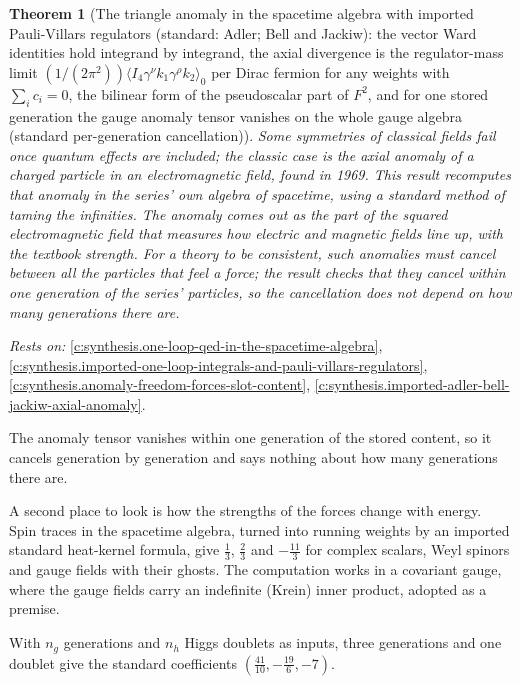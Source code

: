 \documentclass[11pt]{article}
\newtheorem{theorem}{Theorem}[section]
\theoremstyle{definition}
\theoremstyle{plain}
\begin{document}
\begin{theorem}[The triangle anomaly in the spacetime algebra with imported Pauli-Villars regulators (standard: Adler; Bell and Jackiw): the vector Ward identities hold integrand by integrand, the axial divergence is the regulator-mass limit $(1/(2\pi^{2}))\langle I_{4}\gamma^{\nu}k_{1}\gamma^{\rho}k_{2}\rangle_{0}$ per Dirac fermion for any weights with $\sum_{i} c_{i} = 0$, the bilinear form of the pseudoscalar part of $F^{2}$, and for one stored generation the gauge anomaly tensor vanishes on the whole gauge algebra (standard per-generation cancellation)]\label{c:synthesis.triangle-anomaly-in-the-spacetime-algebra-is-the-pseudoscalar-part-of-the-field-square-and-cancels-per-generation}
Some symmetries of classical fields fail once quantum effects are included; the classic case is the axial anomaly of a charged particle in an electromagnetic field, found in 1969. This result recomputes that anomaly in the series' own algebra of spacetime, using a standard method of taming the infinities. The anomaly comes out as the part of the squared electromagnetic field that measures how electric and magnetic fields line up, with the textbook strength. For a theory to be consistent, such anomalies must cancel between all the particles that feel a force; the result checks that they cancel within one generation of the series' particles, so the cancellation does not depend on how many generations there are.
\end{theorem}
\noindent\emph{Rests on:} \ref{c:synthesis.one-loop-qed-in-the-spacetime-algebra}, \ref{c:synthesis.imported-one-loop-integrals-and-pauli-villars-regulators}, \ref{c:synthesis.anomaly-freedom-forces-slot-content}, \ref{c:synthesis.imported-adler-bell-jackiw-axial-anomaly}.

The anomaly tensor vanishes within one generation of the stored content, so it cancels generation by generation and says nothing about how many generations there are.

A second place to look is how the strengths of the forces change with energy. Spin traces in the spacetime algebra, turned into running weights by an imported standard heat-kernel formula, give $\tfrac13$, $\tfrac23$ and $-\tfrac{11}{3}$ for complex scalars, Weyl spinors and gauge fields with their ghosts. The computation works in a covariant gauge, where the gauge fields carry an indefinite (Krein) inner product, adopted as a premise.

With $n_{g}$ generations and $n_{h}$ Higgs doublets as inputs, three generations and one doublet give the standard coefficients $(\tfrac{41}{10}, -\tfrac{19}{6}, -7)$.
\end{document}
